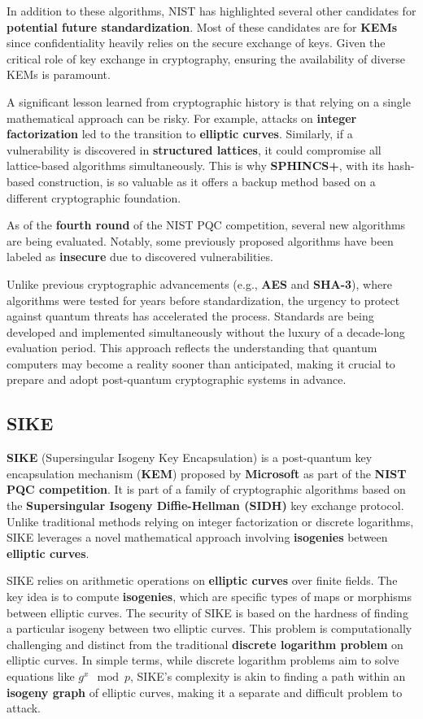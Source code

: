 In addition to these algorithms, NIST has highlighted several other
candidates for \textbf{potential future standardization}. Most of
these candidates are for \textbf{KEMs} since confidentiality heavily
relies on the secure exchange of keys. Given the critical role of key
exchange in cryptography, ensuring the availability of diverse KEMs is
paramount.

A significant lesson learned from cryptographic history is that
relying on a single mathematical approach can be risky. For example,
attacks on \textbf{integer factorization} led to the transition to
\textbf{elliptic curves}. Similarly, if a vulnerability is discovered
in \textbf{structured lattices}, it could compromise all lattice-based
algorithms simultaneously. This is why \textbf{SPHINCS+}, with its
hash-based construction, is so valuable as it offers a backup method
based on a different cryptographic foundation.

As of the \textbf{fourth round} of the NIST PQC competition, several
new algorithms are being evaluated. Notably, some previously proposed
algorithms have been labeled as \textbf{insecure} due to discovered
vulnerabilities. 

Unlike previous cryptographic advancements (e.g., \textbf{AES} and
\textbf{SHA-3}), where algorithms were tested for years before
standardization, the urgency to protect against quantum threats has
accelerated the process. Standards are being developed and implemented
simultaneously without the luxury of a decade-long evaluation period.
This approach reflects the understanding that quantum computers may
become a reality sooner than anticipated, making it crucial to prepare
and adopt post-quantum cryptographic systems in advance.

\subsection{SIKE}
\textbf{SIKE} (Supersingular Isogeny Key Encapsulation) is a
post-quantum key encapsulation mechanism (\textbf{KEM}) proposed by
\textbf{Microsoft} as part of the \textbf{NIST PQC competition}. It is
part of a family of cryptographic algorithms based on the
\textbf{Supersingular Isogeny Diffie-Hellman (SIDH)} key exchange
protocol. Unlike traditional methods relying on integer factorization
or discrete logarithms, SIKE leverages a novel mathematical approach
involving \textbf{isogenies} between \textbf{elliptic curves}.

SIKE relies on arithmetic operations on \textbf{elliptic curves}
over finite fields. The key idea is to compute \textbf{isogenies},
which are specific types of maps or morphisms between elliptic curves.
The security of SIKE is based on the hardness of finding a particular
isogeny between two elliptic curves. This problem is computationally
challenging and distinct from the traditional \textbf{discrete
logarithm problem} on elliptic curves. In simple terms, while discrete
logarithm problems aim to solve equations like \( g^x \mod p \),
SIKE’s complexity is akin to finding a path within an \textbf{isogeny
graph} of elliptic curves, making it a separate and difficult problem
to attack.

